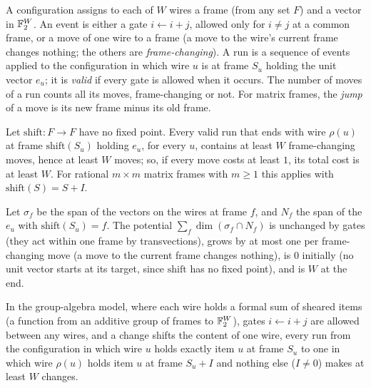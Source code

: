 \begin{definition}[Runs]\label{def:frame-runs}
A configuration assigns to each of $W$ wires a frame (from any set $F$) and a vector in $\mathbb{F}_2^W$. An
event is either a gate $i\leftarrow i+j$, allowed only for $i\ne j$ at a common frame, or a move of one wire to a frame (a move to the wire's current frame changes nothing; the others are \emph{frame-changing}). A run is a sequence of events applied to the configuration in which wire $u$ is at frame $S_u$ holding the unit vector $e_u$; it is \emph{valid} if every gate is allowed when it occurs. The number of moves of a run counts all its moves, frame-changing or not. For matrix frames, the \emph{jump} of a move is its new frame minus its old frame.
\end{definition}

\begin{theorem}\label{thm:frame-change}
Let $\mathrm{shift}:F\to F$ have no fixed point. Every valid run that ends with wire $\rho(u)$ at frame
$\mathrm{shift}(S_u)$ holding $e_u$, for every $u$, contains at least $W$ frame-changing moves, hence at least $W$ moves; so, if every move costs at least $1$, its total cost is at least $W$. For rational $m\times m$ matrix frames with $m\ge1$ this applies with $\mathrm{shift}(S)=S+I$.
\end{theorem}

\begin{outline}
Let $\sigma_f$ be the span of the vectors on the wires at frame $f$, and $N_f$ the span of the $e_u$ with
$\mathrm{shift}(S_u)=f$. The potential $\sum_f\dim(\sigma_f\cap N_f)$ is unchanged by gates (they act
within one frame by transvections), grows by at most one per frame-changing move (a move to the current frame changes nothing), is $0$ initially (no unit vector starts
at its target, since $\mathrm{shift}$ has no fixed point), and is $W$ at the end.
\end{outline}

\begin{theorem}\label{thm:group-algebra}
In the group-algebra model, where each wire holds a formal sum of sheared items (a function from an
additive group of frames to $\mathbb{F}_2^W$), gates $i\leftarrow i+j$ are allowed between any wires, and a change
shifts the content of one wire, every run from the configuration in which wire $u$ holds exactly item $u$ at frame $S_u$ to one in which
wire $\rho(u)$ holds item $u$ at frame $S_u+I$ and nothing else ($I\ne0$) makes at least $W$ changes.
\end{theorem}

